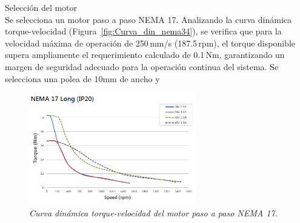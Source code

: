 Selección del motor\\
Se selecciona un motor paso a paso NEMA 17. Analizando la curva dinámica torque-velocidad (Figura~\ref{fig:Curva_din_nema34}), se verifica que para la velocidad máxima de operación de 250\,mm/s (187.5\,rpm), el torque disponible supera ampliamente el requerimiento calculado de 0.1\,Nm, garantizando un margen de seguridad adecuado para la operación continua del sistema.
Se selecciona una polea de 10mm de ancho y 
\begin{figure}[H]
    \centering
    \includegraphics[width=0.65\textwidth]{img/Nema17.png}
    \caption{\textit{Curva dinámica torque-velocidad del motor paso a paso NEMA 17.}}
    \label{fig:Curva_din_nema17}
\end{figure}